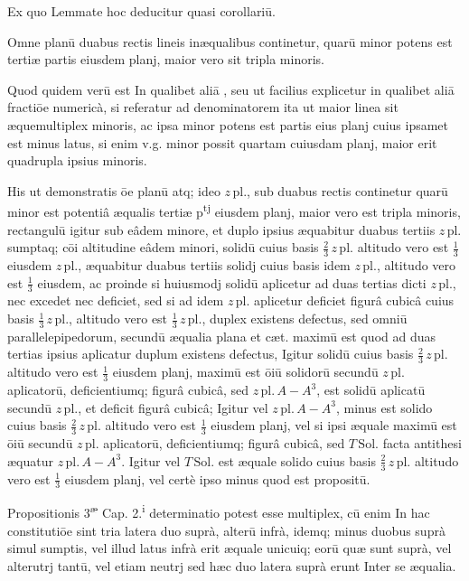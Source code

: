 \documentclass[11pt,a4paper]{article}
\begin{document}
Ex quo Lemmate hoc deducitur quasi corollariū.

Omne planū duabus rectis lineis inæqualibus continetur, quarū minor potens est tertiæ partis eiusdem planj, maior vero sit tripla minoris.

Quod quidem verū est In qualibet aliā , seu ut facilius explicetur in qualibet aliā fractiōe numericà, si referatur ad denominatorem ita ut maior linea sit æquemultiplex minoris, ac ipsa minor  potens est partis eius planj cuius ipsamet est minus latus, si enim v.g. minor possit quartam cuiusdam planj, maior erit quadrupla ipsius minoris.

His ut demonstratis ōe planū atq; ideo $z\,\mathrm{pl.}$, sub duabus rectis continetur quarū minor est potentiâ æqualis tertiæ p\textsuperscript{tj} eiusdem planj, maior vero est tripla minoris, rectangulū igitur sub eâdem minore, et duplo ipsius æquabitur duabus tertiis $z\,\mathrm{pl.}$ sumptaq; cōi altitudine eâdem minori, solidū cuius basis $\tfrac{2}{3}\,z\,\mathrm{pl.}$ altitudo vero est $\tfrac{1}{3}$ eiusdem $z\,\mathrm{pl.}$, æquabitur duabus tertiis solidj cuius basis idem $z\,\mathrm{pl.}$, altitudo vero est $\tfrac{1}{3}$ eiusdem, ac proinde si huiusmodj solidū aplicetur ad duas tertias dicti $z\,\mathrm{pl.}$, nec excedet nec deficiet, sed si ad idem $z\,\mathrm{pl.}$ aplicetur deficiet figurâ cubicâ cuius basis $\tfrac{1}{3}\,z\,\mathrm{pl.}$, altitudo vero est $\tfrac{1}{3}\,z\,\mathrm{pl.}$, duplex existens defectus, sed omniū parallelepipedorum, secundū æqualia plana et cæt. maximū est quod ad duas tertias ipsius aplicatur duplum existens defectus, Igitur solidū cuius basis $\tfrac{2}{3}\,z\,\mathrm{pl.}$ altitudo vero est $\tfrac{1}{3}$ eiusdem planj, maximū est ōiū solidorū secundū $z\,\mathrm{pl.}$ aplicatorū, deficientiumq; figurâ cubicâ, sed $z\,\mathrm{pl.}\,A - A^{3}$, est solidū aplicatū secundū $z\,\mathrm{pl.}$, et deficit figurâ cubicâ; Igitur vel $z\,\mathrm{pl.}\,A - A^{3}$, minus est solido cuius basis $\tfrac{2}{3}\,z\,\mathrm{pl.}$ altitudo vero est $\tfrac{1}{3}$ eiusdem planj, vel si ipsi æquale maximū est ōiū secundū $z\,\mathrm{pl.}$ aplicatorū, deficientiumq; figurâ cubicâ, sed $T\,\mathrm{Sol.}$ facta antithesi æquatur $z\,\mathrm{pl.}\,A - A^{3}$. Igitur vel $T\,\mathrm{Sol.}$ est æquale solido cuius basis $\tfrac{2}{3}\,z\,\mathrm{pl.}$ altitudo vero est $\tfrac{1}{3}$ eiusdem planj, vel certè ipso minus quod est propositū.

Propositionis 3\textsuperscript{æ} Cap. 2.\textsuperscript{i} determinatio potest esse multiplex, cū enim In hac constitutiōe sint tria latera duo suprà, alterū infrà, idemq; minus duobus suprà simul sumptis, vel illud latus infrà erit æquale unicuiq; eorū quæ sunt suprà, vel alterutrj tantū, vel etiam neutrj sed hæc duo latera suprà erunt Inter se æqualia.
\end{document}
